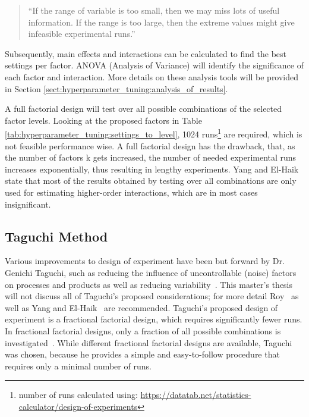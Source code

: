 \begin{quote}
	\begin{em}
		\enquote{If the range of variable is too small, then we may miss lots of useful information. If the range is too large, then the extreme values might give infeasible experimental runs.}~\cite{yang_design_2009}
	\end{em}
\end{quote}

Subsequently, main effects and interactions can be calculated to find the best settings per factor. ANOVA (Analysis of Variance) will identify the significance of each factor and interaction. More details on these analysis tools will be provided in Section \ref{sect:hyperparameter_tuning:analysis_of_results}.

A full factorial design will test over all possible combinations of the selected factor levels. Looking at the proposed factors in Table \ref{tab:hyperparameter_tuning:settings_to_level}, 1024 runs\footnote{number of runs calculated using: \url{https://datatab.net/statistics-calculator/design-of-experiments}} are required, which is not feasible performance wise. A full factorial design has the drawback, that, as the number of factors k gets increased, the number of needed experimental runs increases exponentially, thus resulting in lengthy experiments. Yang and El-Haik~\cite{yang_design_2009} state that most of the results obtained by testing over all combinations are only used for estimating higher-order interactions, which are in most cases insignificant.

\subsection{Taguchi Method}
Various improvements to design of experiment have been but forward by Dr. Genichi Taguchi, such as reducing the influence of uncontrollable (noise) factors on processes and products as well as reducing variability~\cite{roy_primer_1990}. This master's thesis will not discuss all of Taguchi's proposed considerations; for more detail Roy~\cite{roy_primer_1990} as well as Yang and El-Haik~\cite{yang_design_2009} are recommended. Taguchi's proposed design of experiment is a fractional factorial design, which requires significantly fewer runs. In fractional factorial designs, only a fraction of all possible combinations is investigated~\cite{roy_primer_1990}. While different fractional factorial designs are available, Taguchi was chosen, because he provides a simple and easy-to-follow procedure that requires only a minimal number of runs. 

